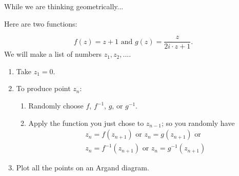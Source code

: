 \documentclass[aspectratio=169]{beamer}
\begin{document}
\begin{frame}{While we are thinking geometrically...}

Here are two functions:

\begin{displaymath}
  f(z) = z + 1 \text{ and } g(z) = \frac{z}{2i \cdot z + 1}.
\end{displaymath}
We will make a list of numbers $ z_1, z_2, ... $.
\begin{enumerate}
  \item  Take $ z_1 = 0 $.
  \item To produce point $ z_n $:
  \begin{enumerate}
    \item Randomly choose $ f $, $ f^{-1} $, $ g $, or $ g^{-1} $.
    \item Apply the function you just chose to $ z_{n-1} $; so you randomly have
      \begin{gather*}
        z_n = f(z_{n+1}) \text{ or } z_n = g(z_{n+1}) \text{ or}\\
        z_n = f^{-1}(z_{n+1}) \text{ or } z_n = g^{-1}(z_{n+1})
      \end{gather*}
  \end{enumerate}
  \item Plot all the points on an Argand diagram.
\end{enumerate}

\end{frame}
\end{document}
